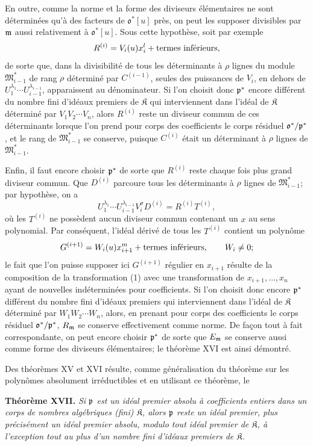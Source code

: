 En outre, comme la norme et la forme des diviseurs élémentaires ne sont déterminées qu'à des facteurs de $\mathfrak o^*[u]$ près, on peut les supposer divisibles par $\mathfrak m$ aussi relativement à $\mathfrak o^*[u]$. Sous cette hypothèse, soit par exemple
\[
 R^{(i)}=V_i(u)x_i^{l}+\hbox{termes inférieurs},
\]
de sorte que, dans la divisibilité de tous les déterminants à $\rho$ lignes du module $\mathfrak M_{i-1}^*$ de rang $\rho$ déterminé par $C^{(i-1)}$, seules des puissances de $V_i$, en dehors de $U_1^{\lambda_1}\cdots U_{i-1}^{\lambda_{i-1}}$, apparaissent au dénominateur. Si l'on choisit donc $\mathfrak p^*$ encore différent du nombre fini d'idéaux premiers de $\mathfrak K$ qui interviennent dans l'idéal de $\mathfrak K$ déterminé par $V_1V_2\cdots V_n$, alors $R^{(i)}$ reste un diviseur commun de ces déterminants lorsque l'on prend pour corps des coefficients le corps résiduel $\mathfrak o^*/\mathfrak p^*$, et le rang de $\mathfrak M_{i-1}^*$ se conserve, puisque $C^{(i)}$ était un déterminant à $\rho$ lignes de $\mathfrak M_{i-1}^*$.

Enfin, il faut encore choisir $\mathfrak p^*$ de sorte que $R^{(i)}$ reste chaque fois plus grand diviseur commun. Que $D^{(i)}$ parcoure tous les déterminants à $\rho$ lignes de $\mathfrak M_{i-1}^*$; par hypothèse, on a
\[
 U_1^{\lambda_1}\cdots U_{i-1}^{\lambda_{i-1}}V_i^{\sigma}D^{(i)}=R^{(i)}T^{(i)},
\]
où les $T^{(i)}$ ne possèdent aucun diviseur commun contenant un $x$ au sens polynomial. Par conséquent, l'idéal dérivé de tous les $T^{(i)}$ contient un polynôme
\[
 G^{(i+1)}=W_i(u)x_{i+1}^{m}+\hbox{termes inférieurs},\qquad W_i\ne0;
\]
le fait que l'on puisse supposer ici $G^{(i+1)}$ régulier en $x_{i+1}$ résulte de la composition de la transformation (1) avec une transformation de $x_{i+1},\ldots,x_n$ ayant de nouvelles indéterminées pour coefficients. Si l'on choisit donc encore $\mathfrak p^*$ différent du nombre fini d'idéaux premiers qui interviennent dans l'idéal de $\mathfrak K$ déterminé par $W_1W_2\cdots W_n$, alors, en prenant pour corps des coefficients le corps résiduel $\mathfrak o^*/\mathfrak p^*$, $R_\mathfrak m$ se conserve effectivement comme norme. De façon tout à fait correspondante, on peut encore choisir $\mathfrak p^*$ de sorte que $E_\mathfrak m$ se conserve aussi comme forme des diviseurs élémentaires; le théorème XVI est ainsi démontré.

Des théorèmes XV et XVI résulte, comme généralisation du théorème sur les polynômes absolument irréductibles et en utilisant ce théorème, le

\textbf{Théorème XVII.} \emph{Si $\mathfrak p$ est un idéal premier absolu à coefficients entiers dans un corps de nombres algébriques (fini) $\mathfrak K$, alors $\mathfrak p$ reste un idéal premier, plus précisément un idéal premier absolu, modulo tout idéal premier de $\mathfrak K$, à l'exception tout au plus d'un nombre fini d'idéaux premiers de $\mathfrak K$.}

